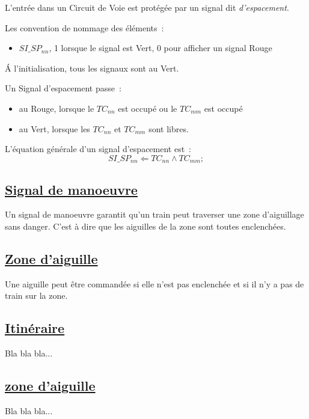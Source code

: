 L'entrée dans un Circuit de Voie est protégée par un signal dit
\emph{d'espacement}.

Les convention de nommage des éléments~:
\begin{itemize}
\item $SI\_SP_{nn}$, 1 lorsque le signal est Vert, 0 pour afficher un
  signal Rouge
\end{itemize}

\'A l'initialisation, tous les signaux sont au Vert.

Un Signal d'espacement passe~:
\begin{itemize}
\item au Rouge, lorsque le $TC_{nn}$ est occupé ou le $TC_{mm}$ est occupé
\item au Vert, lorsque les $TC_{nn}$ et $TC_{mm}$ sont libres.
\end{itemize}

\medskip
L'équation générale d'un signal d'espacement est~:
$$\boxed{
  SI\_SP_{nn} \Leftarrow TC_{nn} \land TC_{mm};
}$$


\subsection{\underline{Signal de manoeuvre}}
\label{sec:esp}

Un signal de manoeuvre garantit qu'un train peut traverser une zone
d'aiguillage sans danger. C'est à dire que les aiguilles de la zone
sont toutes enclenchées.




\subsection{\underline{Zone d'aiguille}}
\label{sec:aig}

Une aiguille peut être commandée si elle n'est pas enclenchée et si il
n'y a pas de train sur la zone.


\subsection{\underline{Itinéraire}}
\label{sec:iti}

Bla bla bla...

\subsection{\underline{zone d'aiguille}}
\label{sec:aig}

Bla bla bla...



\newpage





